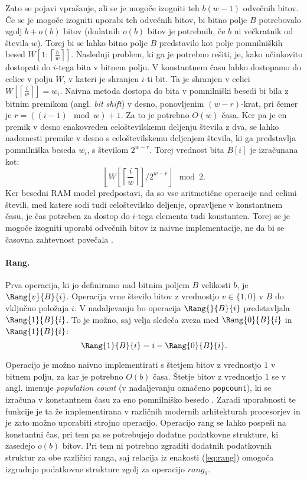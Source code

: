 Zato se pojavi vprašanje, ali se je mogoče izogniti teh $b(w-1)$ odvečnih bitov. Če se je mogoče izogniti uporabi teh odvečnih bitov, bi bitno polje $B$ potrebovalo zgolj $b+o(b)$ bitov (dodatnih $o(b)$ bitov je potrebnih, če $b$ ni večkratnik od števila $w$). Torej bi se lahko bitno polje $B$ predstavilo kot polje pomnilniških besed $W\left[1:\left\lceil\frac{b}{w}\right\rceil\right]$. Naslednji problem, ki ga je potrebno rešiti, je, kako učinkovito dostopati do $i$-tega bita v bitnem polju. V konstantnem času lahko dostopamo do celice v polju $W$, v kateri je shranjen $i$-ti bit. Ta je shranjen v celici $W\left[\left\lceil\frac{i}{w}\right\rceil\right]=w_i$. Naivna metoda dostopa do bita v pomnilniški besedi bi bila z bitnim premikom (angl. \textit{bit shift}) v desno, ponovljenim $(w-r)$-krat, pri čemer je $r=((i-1)\mod{w}) +1$. Za to je potrebno $O(w)$ časa. Ker pa je en premik v desno enakovreden celoštevilskemu deljenju števila z dva, se lahko nadomesti premike v desno s celoštevilskemu deljenjem števila, ki ga predstavlja pomnilniška beseda $w_i$, s številom $2^{w-r}$. Torej vrednost bita $B[i]$ je izračunana kot:
$$
    \left\lfloor W\left[\left\lceil\frac{i}{w}\right\rceil\right]/2^{w-r}\right\rfloor \mod{2}.
$$
Ker besedni RAM model predpostavi, da so vse aritmetične operacije nad celimi števili, med katere sodi tudi celoštevilsko deljenje, opravljene v konstantnem času, je čas potreben za dostop do $i$-tega elementa tudi konstanten. Torej se je mogoče izogniti uporabi odvečnih bitov iz naivne implementacije, ne da bi se časovna zahtevnost povečala \cite{Navarro2016}.

\paragraph{Rang.} 
Prva operacija, ki jo definiramo nad bitnim poljem $B$ velikosti $b$, je $\Rang{v}{B}{i}$. Operacija vrne število bitov z vrednostjo $v\in\{1,0\}$ v $B$ do vključno položaja $i$. V nadaljevanju bo operacija $\Rang{}{B}{i}$ predstavljala $\Rang{1}{B}{i}$. To je možno, saj velja sledeča zveza med $\Rang{0}{B}{i}$ in $\Rang{1}{B}{i}$:
\begin{equation}\label{eq:rang}
    \Rang{1}{B}{i}=i-\Rang{0}{B}{i}.
\end{equation}

Operacijo je možno naivno implementirati s štetjem bitov z vrednostjo $1$ v bitnem polju, za kar je potrebno $O(b)$ časa. Štetje bitov z vrednostjo $1$ se v angl. imenuje \textit{population count} (v nadaljevanju označeno \texttt{popcount}), ki se izračuna v konstantnem času za eno pomnilniško besedo \cite{Brodnik1995,Knuth2011}. Zaradi uporabnosti te funkcije je ta že implementirana v različnih modernih arhitekturah procesorjev in je zato možno uporabiti strojno operacijo. Operacijo rang se lahko pospeši na konstantni čas, pri tem pa se potrebujejo dodatne podatkovne strukture, ki zasedejo $o(b)$ bitov. Pri tem ni potrebno zgraditi dodatnih podatkovnih struktur za obe različici ranga, saj relacija iz enakosti (\ref{eq:rang}) omogoča izgradnjo podatkovne strukture zgolj za operacijo $rang_1$.

